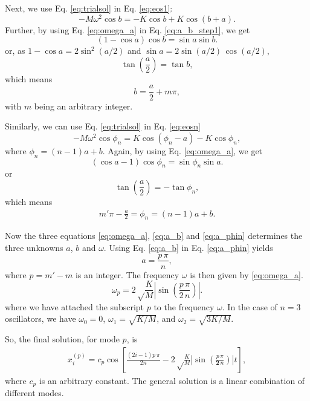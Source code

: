 \documentclass[11pt]{article}
\begin{document}
Next, we use Eq. \eqref{eq:trialsol} in Eq. \eqref{eq:eos1}:
\begin{equation}
-M \omega^2 \cos b
=
-K \cos b
+K \cos(b + a).
\label{eq:a_b_step1}
\end{equation}
Further, by using Eq. \eqref{eq:omega_a} in Eq. \eqref{eq:a_b_step1},
we get
\begin{equation*}
(1 - \cos a) \cos b
= \sin a \sin b.
\end{equation*}
or, as
$1 - \cos a = 2 \sin^2(a/2)$
and
$\sin a = 2 \sin(a/2) \, \cos(a/2)$,
\begin{equation*}
\tan \left( \frac a 2 \right)
= \tan b,
\end{equation*}
which means
\begin{equation}
b = \frac a 2 + m \pi,
\label{eq:a_b}
\end{equation}
with $m$ being an arbitrary integer.



Similarly, we can use Eq. \eqref{eq:trialsol} in Eq. \eqref{eq:eosn}
\begin{equation*}
-M \omega^2 \cos \phi_n
=
K \cos(\phi_n - a)
-K \cos \phi_n,
\end{equation*}
where $\phi_n = (n - 1) a + b$.
%
Again, by using Eq. \eqref{eq:omega_a}, we get
\[
(\cos a - 1) \cos \phi_n = \sin \phi_n \sin a.
\]
or
\[
\tan \left( \frac a  2 \right) = -\tan \phi_n,
\]
which means
\begin{align}
m' \pi - \frac a 2 = \phi_n = (n - 1) a + b.
\label{eq:a_phin}
\end{align}


Now the three equations \eqref{eq:omega_a}, \eqref{eq:a_b} and \eqref{eq:a_phin}
determines the three unknowns $a$, $b$ and $\omega$.
%
Using Eq. \eqref{eq:a_b} in Eq. \eqref{eq:a_phin} yields
\begin{equation*}
a = \frac{ p \, \pi } n,
\end{equation*}
where $p = m' - m$ is an integer.
%
The frequency $\omega$ is then given by \eqref{eq:omega_a}.
\begin{equation}
\omega_p
=
2 \sqrt \frac K M
\left|
\sin \left( \frac {p \, \pi} {2 \, n} \right)
\right|.
\label{eq:freq}
\end{equation}
where we have attached the subscript $p$ to the frequency $\omega$.
%
In the case of $n = 3$ oscillators, we have
$\omega_0 = 0$,
$\omega_1 = \sqrt{K/M}$,
and
$\omega_2 = \sqrt{3K/M}$.


So, the final solution, for mode $p$, is
\begin{align}
  x_i^{(p)}
=
  c_p \cos\left[
  \frac{ (2 i - 1) p \, \pi } { 2 n }
  -2 \sqrt \frac K M
  \left|
  \sin \left( \frac {p \, \pi} {\mathbf 2 \, n} \right)
  \right| t
  \right],
  \label{eq:obcsol}
\end{align}
where $c_p$ is an arbitrary constant.
%
The general solution is a linear combination of different modes.
\end{document}
